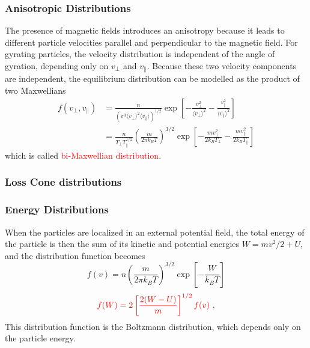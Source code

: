 \documentclass[12pt,a4paper]{article}
\begin{document}
\subsubsection{Anisotropic Distributions}
The presence of magnetic fields introduces an anisotropy because it leads to different particle velocities parallel and perpendicular to the magnetic field. For gyrating particles, the velocity distribution is independent of the angle of gyration, depending only on $v_\perp$ and $v_\parallel$. Because these two velocity components are independent, the equilibrium distribution can be modelled as the product of two Maxwellians 
\begin{align}
f(v_\perp, v_\parallel) & = \frac{n}{ (\pi^3 \langle v_\perp \rangle^2 \langle v_\parallel \rangle )^{1/2} } \exp \left[-\frac{v_\perp^2}{\langle v_\perp \rangle^2} -\frac{v^2_\parallel}{\langle v_\parallel \rangle^2} \right] \\
& = \frac{n}{T_\perp T_\parallel^{1/2} } \left(\frac{m}{2\pi k_BT} \right)^{3/2} \exp \left[-\frac{ m v_\perp^2}{2k_B T_\perp} -\frac{ m v_\parallel^2}{2k_B T_\parallel} \right]
\end{align}
which is called \textcolor{red}{bi-Maxwellian distribution}.




\subsubsection{Loss Cone distributions}


\subsubsection{Energy Distributions}
When the particles are localized in an external potential field, the total energy of the particle is then the sum of its kinetic and potential energies $W = mv^2/2 +U$, and the distribution function becomes
\begin{equation}
f(v) = n \left(\frac{m}{2\pi k_BT} \right)^{3/2} \exp \left[-\frac{W}{k_B T} \right]
\end{equation}
\begin{equation}
\color{red} f(W) = 2 \left[\frac{2(W-U)}{m} \right]^{1/2} f(v) ~,
\end{equation}
This distribution function is the Boltzmann distribution, which depends only on the particle energy.
\end{document}
